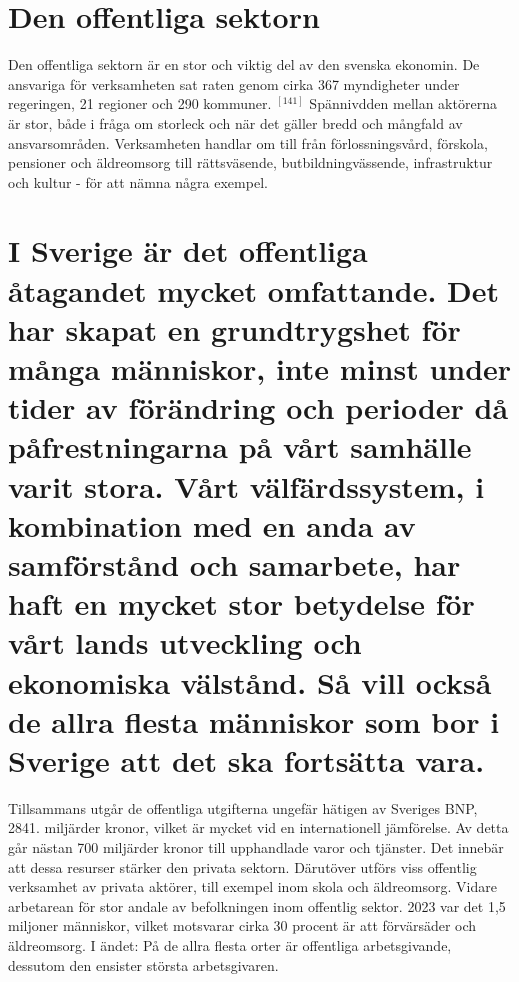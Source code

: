 {{{{{{{{{{{{{{\section*{Den offentliga sektorn}
Den offentliga sektorn är en stor och viktig del av den svenska ekonomin. De ansvariga för verksamheten sat raten genom cirka 367 myndigheter under regeringen, 21 regioner och 290 kommuner. \({ }^{[141]}\) Spännivdden mellan aktörerna är stor, både i fråga om storleck och när det gäller bredd och mångfald av ansvarsområden. Verksamheten handlar om till från förlossningsvård, förskola, pensioner och äldreomsorg till rättsväsende, butbildningvässende, infrastruktur och kultur - för att nämna några exempel.
\section*{I Sverige är det offentliga åtagandet mycket omfattande. Det har skapat en grundtrygshet för många människor, inte minst under tider av förändring och perioder då påfrestningarna på vårt samhälle varit stora. Vårt välfärdssystem, i kombination med en anda av samförstånd och samarbete, har haft en mycket stor betydelse för vårt lands utveckling och ekonomiska välstånd. Så vill också de allra flesta människor som bor i Sverige att det ska fortsätta vara.}
Tillsammans utgår de offentliga utgifterna ungefär hätigen av Sveriges BNP, 2841. miljärder kronor, vilket är mycket vid en internationell jämförelse. Av detta går nästan 700 miljärder kronor till upphandlade varor och tjänster. Det innebär att dessa resurser stärker den privata sektorn. Därutöver utförs viss offentlig verksamhet av privata aktörer, till exempel inom skola och äldreomsorg. Vidare arbetarean för stor andale av befolkningen inom offentlig sektor. 2023 var det 1,5 miljoner människor, vilket motsvarar cirka 30 procent är att förvärsäder och äldreomsorg. I ändet: På de allra flesta orter är offentliga arbetsgivande, dessutom den ensister största arbetsgivaren.

}}}}}}}}}}}}}}
